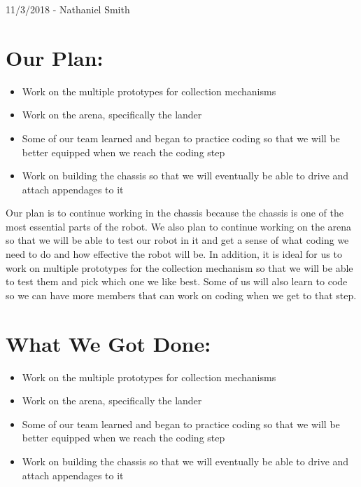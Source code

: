 \documentclass[12pt]{article}
\begin{document}
11/3/2018 - Nathaniel Smith 

\section{Our Plan:} %
\begin{itemize}
	\item Work on the multiple prototypes for collection mechanisms
	\item Work on the arena, specifically the lander
\item Some of our team learned and began to practice coding so that we will be better equipped when we reach the coding step
\item Work on building the chassis so that we will eventually be able to drive and attach appendages to it
\end{itemize}

Our plan is to continue working in the chassis because the chassis is one of the most essential parts of the robot. We also plan to continue working on the arena so that we will be able to test our robot in it and get a sense of what coding we need to do and how effective the robot will be. In addition, it is ideal for us to work on multiple prototypes for the collection mechanism so that we will be able to test them and pick which one we like best. Some of us will also learn to code so we can have more members that can work on coding when we get to that step.

\section{What We Got Done:} %
\begin{itemize}
	\item Work on the multiple prototypes for collection mechanisms
	\item Work on the arena, specifically the lander
\item Some of our team learned and began to practice coding so that we will be better equipped when we reach the coding step
\item Work on building the chassis so that we will eventually be able to drive and attach appendages to it
\end{itemize}
\end{document}
